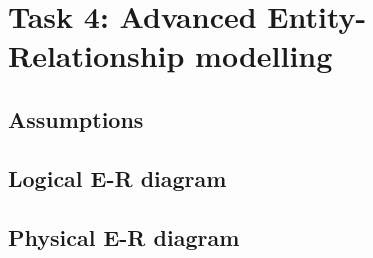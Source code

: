 \newpage
\section{Task 4: Advanced Entity-Relationship modelling}

\subsection{Assumptions}

\subsection{Logical E-R diagram}

\subsection{Physical E-R diagram}